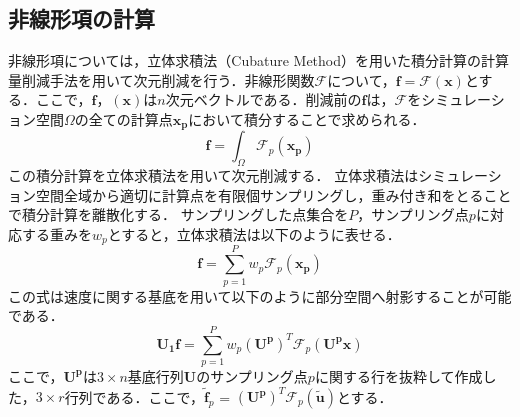 \documentclass[a4j,12pt]{jreport}
\begin{document}
\subsection{非線形項の計算}\label{noLinear}
非線形項については，立体求積法（Cubature Method）を用いた積分計算の計算量削減手法を用いて次元削減を行う．非線形関数$\mathcal{F}$について，$\bm{f} = \mathcal{F}(\bm{x})$とする．ここで，$\bm{f}$，$(\bm{x})$は$n$次元ベクトルである．削減前の$\bm{f}$は，$\mathcal{F}$をシミュレーション空間$\Omega$の全ての計算点$\bm{x_p}$において積分することで求められる．
\[
	\bm{f} = \int_\Omega\mathcal{F}_p(\bm{x_p})
\]
この積分計算を立体求積法を用いて次元削減する．
立体求積法はシミュレーション空間全域から適切に計算点を有限個サンプリングし，重み付き和をとることで積分計算を離散化する．
サンプリングした点集合を$P$，サンプリング点$p$に対応する重みを$w_p$とすると，立体求積法は以下のように表せる．
\[
	\bm{f} = \sum_{p=1}^Pw_p\mathcal{F}_p(\bm{x_p})
\]
この式は速度に関する基底を用いて以下のように部分空間へ射影することが可能である．
\[
	\bm{U_1}\bm{f} = \sum_{p=1}^Pw_p(\bm{U^p})^T\mathcal{F}_p(\bm{U^p}\bm{x})
\]
ここで，$\bm{U^p}$は$3 \times n$基底行列$\bm{U}$のサンプリング点$p$に関する行を抜粋して作成した，$3 \times r$行列である．ここで，$\bm{\tilde{f}}_p$ = $(\bm{U^p})^T\mathcal{F}_p(\bm{\tilde{u}})$とする．
\end{document}
